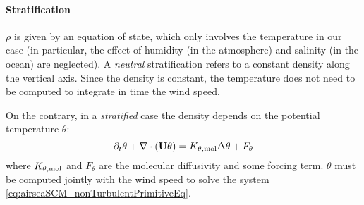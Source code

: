 \paragraph{Stratification}
$\rho$ is given by an equation of state, which only involves
the temperature in our case (in particular, the effect
of humidity (in the atmosphere) and salinity (in the ocean)
are neglected).
A \textit{neutral} stratification refers to a constant 
density along the vertical axis. Since the density is
constant, the temperature does not need to be computed
to integrate in time the wind speed.
\par
On the contrary, in a \textit{stratified} case the
density depends on the potential temperature $\theta$:
\begin{equation}
	\partial_t \theta + \nabla \cdot (\mathbf{U} \theta) =
	K_{\theta, {\rm mol}} \Delta \theta + F_\theta
\end{equation}
where $K_{\theta, {\rm mol}}$ and $F_\theta$ are
the molecular diffusivity and some forcing term.
$\theta$ must be computed jointly with the wind
speed to solve the system
\eqref{eq:airseaSCM_nonTurbulentPrimitiveEq}.

